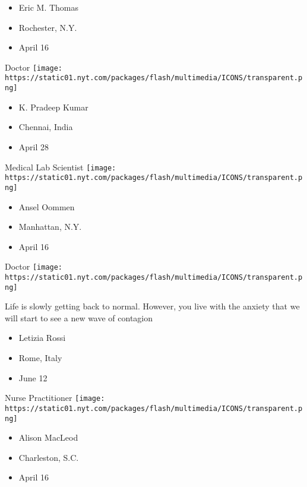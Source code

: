 \begin{itemize}
\tightlist
\item
  Eric M. Thomas
\item
  Rochester, N.Y.
\item
  April 16
\end{itemize}

\protect\hyperlink{item-k-pradeep-kumar}{}

Doctor
\texttt{[image: https://static01.nyt.com/packages/flash/multimedia/ICONS/transparent.png]}

\begin{itemize}
\tightlist
\item
  K. Pradeep Kumar
\item
  Chennai, India
\item
  April 28
\end{itemize}

\protect\hyperlink{item-ansel-oommen}{}

Medical Lab Scientist
\texttt{[image: https://static01.nyt.com/packages/flash/multimedia/ICONS/transparent.png]}

\begin{itemize}
\tightlist
\item
  Ansel Oommen
\item
  Manhattan, N.Y.
\item
  April 16
\end{itemize}

\protect\hyperlink{item-letizia-rossi}{}

Doctor
\texttt{[image: https://static01.nyt.com/packages/flash/multimedia/ICONS/transparent.png]}

Life is slowly getting back to normal. However, you live with the
anxiety that we will start to see a new wave of contagion

\begin{itemize}
\tightlist
\item
   Letizia Rossi
\item
  Rome, Italy
\item
  June 12
\end{itemize}

\protect\hyperlink{item-alison-macleod}{}

Nurse Practitioner
\texttt{[image: https://static01.nyt.com/packages/flash/multimedia/ICONS/transparent.png]}

\begin{itemize}
\tightlist
\item
  Alison MacLeod
\item
  Charleston, S.C.
\item
  April 16
\end{itemize}

